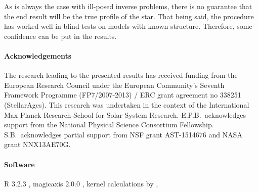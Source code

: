 As is always the case with ill-posed inverse problems, there is no guarantee that the end result will be the true profile of the star. 
That being said, the procedure has worked well in blind tests on models with known structure. 
Therefore, some confidence can be put in the results. 


%
%
%
%
\paragraph*{Acknowledgements} 
\noindent The research leading to the presented results has received funding from the European Research Council under the European Community's Seventh Framework Programme (FP7/2007-2013) / ERC grant agreement no 338251 (StellarAges). This research was undertaken in the context of the International Max Planck Research School for Solar System Research. E.P.B.\ acknowledges support from the National Physical Science Consortium Fellowship. S.B.\ acknowledges partial support from NSF grant AST-1514676 and NASA grant NNX13AE70G.  

\paragraph*{Software} 
\noindent R 3.2.3 \citep{R}, magicaxis 2.0.0 \citep{magicaxis2}, 
kernel calculations by \citet{kerexact},  

\iffalse
\Needspace{3\baselineskip}
%


\fi
